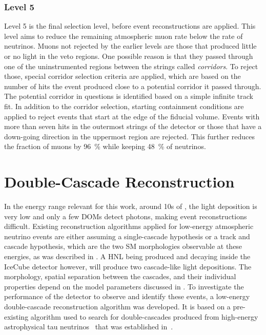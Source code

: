 \subsubsection{Level 5} 

Level 5 is the final selection level, before event reconstructions are applied. This level aims to reduce the remaining atmospheric muon rate below the rate of neutrinos. Muons not rejected by the earlier levels are those that produced little or no light in the veto regions. One possible reason is that they passed through one of the uninstrumented regions between the strings called \textit{corridors}. To reject those, special corridor selection criteria are applied, which are based on the number of hits the event produced close to a potential corridor it passed through. The potential corridor in questions is identified based on a simple infinite track fit. In addition to the corridor selection, starting containment conditions are applied to reject events that start at the edge of the fiducial volume. Events with more than seven hits in the outermost strings of the detector or those that have a down-going direction in the uppermost region are rejected. This further reduces the fraction of muons by \SI{96}{\percent} while keeping \SI{48}{\percent} of neutrinos.


\section{Double-Cascade Reconstruction} 

In the energy range relevant for this work, around 10s of \si{\gev}, the light deposition is very low and only a few DOMs detect photons, making event reconstructions difficult. Existing reconstruction algorithms applied for low-energy atmospheric neutrino events are either assuming a single-cascade hypothesis or a track and cascade hypothesis, which are the two SM morphologies observable at these energies, as was described in . A HNL being produced and decaying inside the IceCube detector however, will produce two cascade-like light depositions. The morphology, spatial separation between the cascades, and their individual properties depend on the model parameters discussed in . To investigate the performance of the detector to observe and identify these events, a low-energy double-cascade reconstruction algorithm was developed. It is based on a pre-existing algorithm used to search for double-cascades produced from high-energy astrophysical tau neutrinos~ that was established in~.


